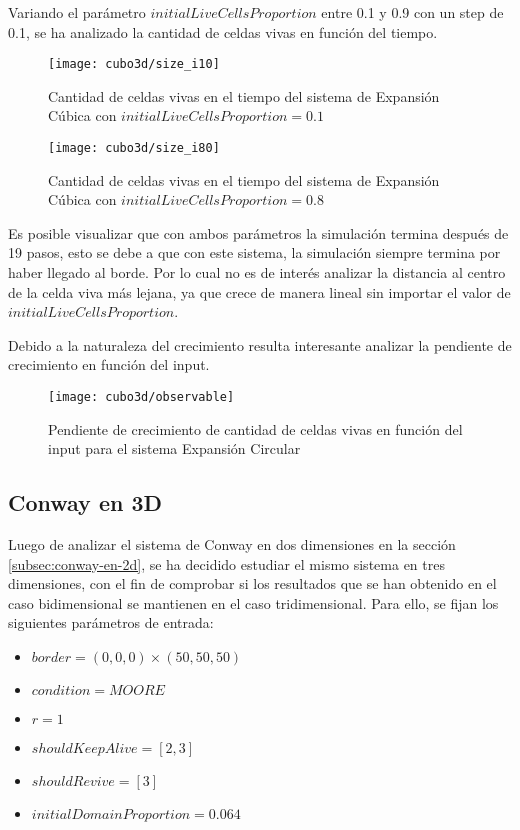 Variando el parámetro $initialLiveCellsProportion$ entre 0.1 y 0.9 con un step de 0.1, se ha analizado la cantidad de celdas vivas en función
del tiempo.

\begin{figure}[H]
    \centering
    \texttt{[image: cubo3d/size\_i10]}
    \caption{Cantidad de celdas vivas en el tiempo del sistema de Expansión Cúbica con $initialLiveCellsProportion = 0.1$}
    \label{fig:cubo3d_i10}
\end{figure}
\begin{figure}[H]
    \centering
    \texttt{[image: cubo3d/size\_i80]}
    \caption{Cantidad de celdas vivas en el tiempo del sistema de Expansión Cúbica con $initialLiveCellsProportion = 0.8$}
    \label{fig:cubo3d_i80}
\end{figure}


Es posible visualizar que con ambos parámetros la simulación termina después de 19 pasos, esto se debe a que con este sistema, la simulación
siempre termina por haber llegado al borde. Por lo cual no es de interés analizar la distancia al centro de la celda viva más lejana, ya que
crece de manera lineal sin importar el valor de $initialLiveCellsProportion$.

Debido a la naturaleza del crecimiento resulta interesante analizar la pendiente de crecimiento en función del input.


\begin{figure}[H]
    \centering
    \texttt{[image: cubo3d/observable]}
    \caption{Pendiente de crecimiento de cantidad de celdas vivas en función del input para el sistema Expansión Circular}
    \label{fig:cubo3d_observable}
\end{figure}


\subsection{Conway en 3D}\label{subsec:conway-en-3d}

Luego de analizar el sistema de Conway en dos dimensiones en la sección \ref{subsec:conway-en-2d},
se ha decidido estudiar el mismo sistema en tres dimensiones, con el fin de comprobar si los resultados
que se han obtenido en el caso bidimensional se mantienen en el caso tridimensional.
Para ello, se fijan los siguientes parámetros de entrada:
\begin{itemize}
    \item $border = (0, 0, 0) \times (50, 50, 50)$
    \item $condition = MOORE$
    \item $r = 1$
    \item $shouldKeepAlive = [2, 3]$
    \item $shouldRevive = [3]$
    \item $initialDomainProportion = 0.064$
\end{itemize}

